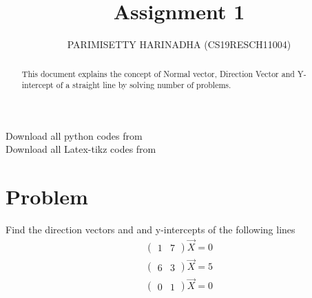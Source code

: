 \documentclass[journal,12pt,twocolumn]{IEEEtran}
\title{Assignment 1}
\author{PARIMISETTY HARINADHA (CS19RESCH11004)}
\newcommand{\myvec}[1]{\ensuremath{\begin{pmatrix}#1\end{pmatrix}}}
\begin{document}
\maketitle
\newpage
\begin{abstract}
This document explains the concept of Normal vector, Direction Vector and Y-intercept of a straight line by solving number of problems.
\end{abstract}
Download all python codes from 
 \\
\newline
Download all Latex-tikz codes from 

\section{Problem}
Find the direction vectors and and y-intercepts of the following lines \\
\begin{align} 
    		\myvec{ 1 & 7 } \vec{X} =  0
\end{align}
\begin{align} 
    		\myvec{ 6 & 3 } \vec{X} =  5
\end{align}
\begin{align} 
    		\myvec{ 0 & 1 } \vec{X} =  0
\end{align}
\end{document}
